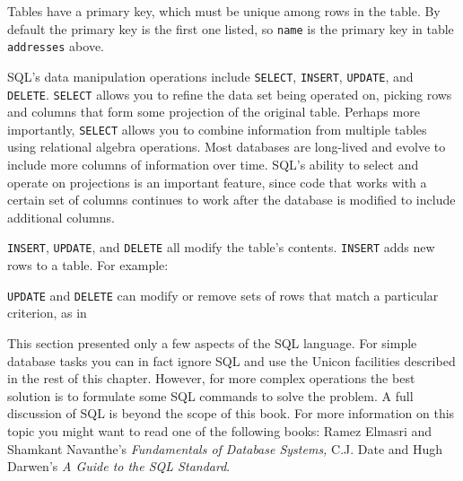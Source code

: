 Tables have a primary key, which must be unique among rows in the table.
By default the primary key is the first one listed, so \texttt{name} is
the primary key in table \texttt{addresses} above.

SQL's data manipulation operations include
\texttt{SELECT}, \texttt{INSERT}, \texttt{UPDATE}, and \texttt{DELETE}.
\texttt{SELECT} allows you to refine the data set being operated on,
picking rows and columns that form some projection of the original
table. Perhaps more importantly, \texttt{SELECT} allows you to combine
information from multiple tables using relational algebra operations.
Most databases are long-lived and evolve to include more columns of
information over time. SQL's ability to select and
operate on projections is an important feature, since code that works
with a certain set of columns continues to work after the database is
modified to include additional columns.

\texttt{INSERT}, \texttt{UPDATE}, and \texttt{DELETE} all modify the
table's contents. \texttt{INSERT} adds new rows to a
table. For example:


\texttt{UPDATE} and \texttt{DELETE} can modify or remove sets of rows
that match a particular criterion, as in


This section presented only a few aspects of the SQL language. For
simple database tasks you can in fact ignore SQL and use the Unicon
facilities described in the rest of this chapter. However, for more
complex operations the best solution is to formulate some SQL commands
to solve the problem. A full discussion of SQL is beyond the scope of
this book. For more information on this topic you might want to read
one of the following books: Ramez Elmasri and Shamkant
Navanthe's \textit{Fundamentals of Database Systems,}
C.J. Date and Hugh Darwen's \textit{A Guide to the SQL Standard}.

